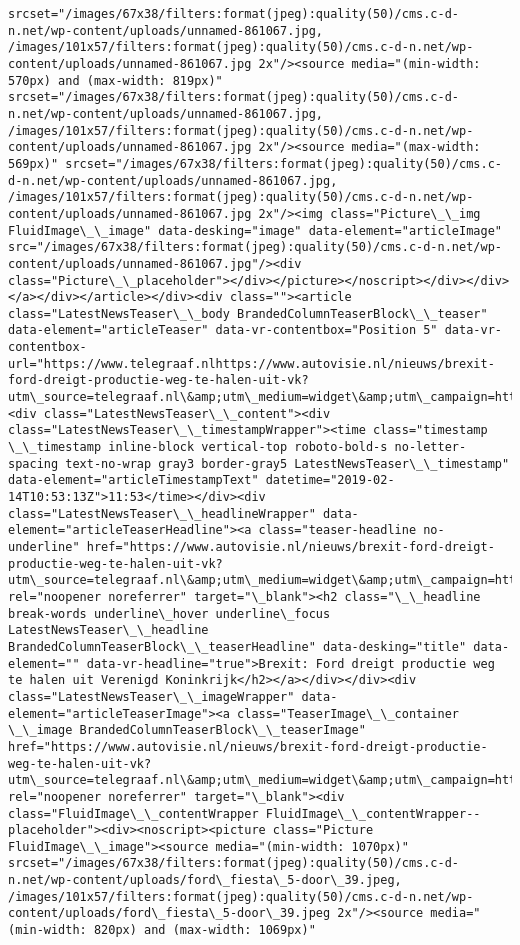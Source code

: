 \documentclass[11pt]{article}
\begin{document}
\begin{Verbatim}[commandchars=\\\{\}]
srcset="/images/67x38/filters:format(jpeg):quality(50)/cms.c-d-n.net/wp-content/uploads/unnamed-861067.jpg, /images/101x57/filters:format(jpeg):quality(50)/cms.c-d-n.net/wp-content/uploads/unnamed-861067.jpg 2x"/><source media="(min-width: 570px) and (max-width: 819px)" srcset="/images/67x38/filters:format(jpeg):quality(50)/cms.c-d-n.net/wp-content/uploads/unnamed-861067.jpg, /images/101x57/filters:format(jpeg):quality(50)/cms.c-d-n.net/wp-content/uploads/unnamed-861067.jpg 2x"/><source media="(max-width: 569px)" srcset="/images/67x38/filters:format(jpeg):quality(50)/cms.c-d-n.net/wp-content/uploads/unnamed-861067.jpg, /images/101x57/filters:format(jpeg):quality(50)/cms.c-d-n.net/wp-content/uploads/unnamed-861067.jpg 2x"/><img class="Picture\_\_img FluidImage\_\_image" data-desking="image" data-element="articleImage" src="/images/67x38/filters:format(jpeg):quality(50)/cms.c-d-n.net/wp-content/uploads/unnamed-861067.jpg"/><div class="Picture\_\_placeholder"></div></picture></noscript></div></div></a></div></article></div><div class=""><article class="LatestNewsTeaser\_\_body BrandedColumnTeaserBlock\_\_teaser" data-element="articleTeaser" data-vr-contentbox="Position 5" data-vr-contentbox-url="https://www.telegraaf.nlhttps://www.autovisie.nl/nieuws/brexit-ford-dreigt-productie-weg-te-halen-uit-vk?utm\_source=telegraaf.nl\&amp;utm\_medium=widget\&amp;utm\_campaign=https://www.telegraaf.nl/"><div class="LatestNewsTeaser\_\_content"><div class="LatestNewsTeaser\_\_timestampWrapper"><time class="timestamp \_\_timestamp inline-block vertical-top roboto-bold-s no-letter-spacing text-no-wrap gray3 border-gray5 LatestNewsTeaser\_\_timestamp" data-element="articleTimestampText" datetime="2019-02-14T10:53:13Z">11:53</time></div><div class="LatestNewsTeaser\_\_headlineWrapper" data-element="articleTeaserHeadline"><a class="teaser-headline no-underline" href="https://www.autovisie.nl/nieuws/brexit-ford-dreigt-productie-weg-te-halen-uit-vk?utm\_source=telegraaf.nl\&amp;utm\_medium=widget\&amp;utm\_campaign=https://www.telegraaf.nl/" rel="noopener noreferrer" target="\_blank"><h2 class="\_\_headline break-words underline\_hover underline\_focus LatestNewsTeaser\_\_headline BrandedColumnTeaserBlock\_\_teaserHeadline" data-desking="title" data-element="" data-vr-headline="true">Brexit: Ford dreigt productie weg te halen uit Verenigd Koninkrijk</h2></a></div></div><div class="LatestNewsTeaser\_\_imageWrapper" data-element="articleTeaserImage"><a class="TeaserImage\_\_container \_\_image BrandedColumnTeaserBlock\_\_teaserImage" href="https://www.autovisie.nl/nieuws/brexit-ford-dreigt-productie-weg-te-halen-uit-vk?utm\_source=telegraaf.nl\&amp;utm\_medium=widget\&amp;utm\_campaign=https://www.telegraaf.nl/" rel="noopener noreferrer" target="\_blank"><div class="FluidImage\_\_contentWrapper FluidImage\_\_contentWrapper--placeholder"><div><noscript><picture class="Picture FluidImage\_\_image"><source media="(min-width: 1070px)" srcset="/images/67x38/filters:format(jpeg):quality(50)/cms.c-d-n.net/wp-content/uploads/ford\_fiesta\_5-door\_39.jpeg, /images/101x57/filters:format(jpeg):quality(50)/cms.c-d-n.net/wp-content/uploads/ford\_fiesta\_5-door\_39.jpeg 2x"/><source media="(min-width: 820px) and (max-width: 1069px)" 
\end{Verbatim}
\end{document}
